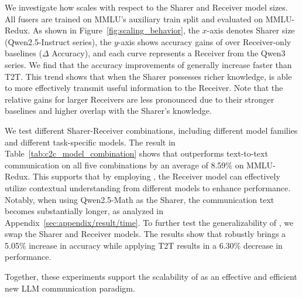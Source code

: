 We investigate how \name scales with respect to the Sharer and Receiver model sizes. 
All \name fusers are trained on MMLU's auxiliary train split and evaluated on MMLU-Redux. 
As shown in Figure~\ref{fig:scaling_behavior}, the $x$-axis denotes Sharer size (Qwen2.5-Instruct series), the $y$-axis shows accuracy gains of \name over Receiver-only baselines ($\Delta$ Accuracy), and each curve represents a Receiver from the Qwen3 series. 
We find that the accuracy improvements of \name generally increase faster than T2T.
This trend shows that when the Sharer possesses richer knowledge, \name is able to more effectively transmit useful information to the Receiver. 
Note that the relative gains for larger Receivers are less pronounced due to their stronger baselines and higher overlap with the Sharer’s knowledge.

We test different Sharer-Receiver combinations, including different model families and different task-specific models. 
The result in Table~\ref{tab:c2c_model_combination} shows that \name outperforms text-to-text communication on all five combinations by an average of 8.59\% on MMLU-Redux. This supports that by employing \name, the Receiver model can effectively utilize contextual understanding from different models to enhance performance. 
Notably, when using Qwen2.5-Math as the Sharer, the communication text becomes substantially longer, as analyzed in Appendix~\ref{sec:appendix/result/time}.
To further test the generalizability of \name, we swap the Sharer and Receiver models. The results show that \name robustly brings a 5.05\% increase in accuracy while applying T2T results in a 6.30\% decrease in performance. 

Together, these experiments support the scalability of \name as an effective and efficient new LLM communication paradigm.

